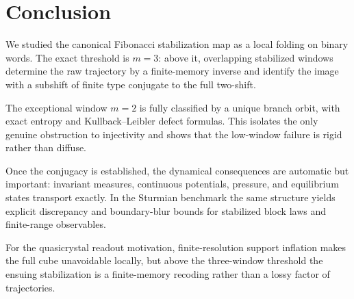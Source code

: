 \section{Conclusion}\label{sec:conclusion}

We studied the canonical Fibonacci stabilization map as a local folding on binary words.  The exact threshold is $m=3$: above it, overlapping stabilized windows determine the raw trajectory by a finite-memory inverse and identify the image with a subshift of finite type conjugate to the full two-shift.

The exceptional window $m=2$ is fully classified by a unique branch orbit, with exact entropy and Kullback--Leibler defect formulas. This isolates the only genuine obstruction to injectivity and shows that the low-window failure is rigid rather than diffuse.

Once the conjugacy is established, the dynamical consequences are automatic but important: invariant measures, continuous potentials, pressure, and equilibrium states transport exactly. In the Sturmian benchmark the same structure yields explicit discrepancy and boundary-blur bounds for stabilized block laws and finite-range observables.

For the quasicrystal readout motivation, finite-resolution support inflation makes the full cube unavoidable locally, but above the three-window threshold the ensuing stabilization is a finite-memory recoding rather than a lossy factor of trajectories.
